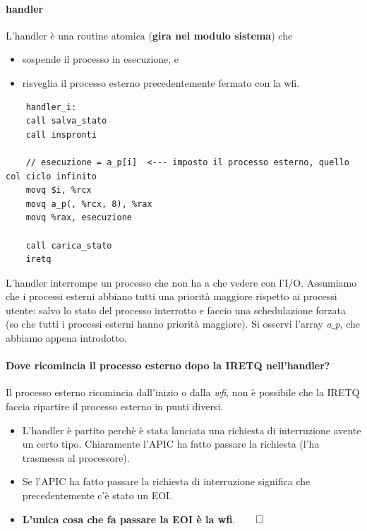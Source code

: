 \paragraph{handler} L'handler è una routine atomica (\textbf{gira nel modulo sistema}) che 
\begin{itemize}
	\item sospende il processo in esecuzione, e
	\item risveglia il processo esterno precedentemente fermato con la wfi.
\end{itemize} 
\begin{verbatim}
	handler_i:
	call salva_stato
	call inspronti
	
	// esecuzione = a_p[i]  <--- imposto il processo esterno, quello col ciclo infinito
	movq $i, %rcx 
	movq a_p(, %rcx, 8), %rax
	movq %rax, esecuzione
	
	call carica_stato
	iretq
\end{verbatim} L'handler interrompe un processo che non ha a che vedere con l'I/O. Assumiamo che i processi esterni abbiano tutti una priorità maggiore rispetto ai processi utente: salvo lo stato del processo interrotto e faccio una schedulazione forzata (so che tutti i processi esterni hanno priorità maggiore). Si osservi l'array \emph{a$\_$p}, che abbiamo appena introdotto.

\paragraph{Dove ricomincia il processo esterno dopo la IRETQ nell'handler?} 
Il processo esterno ricomincia dall'inizio o dalla \textit{wfi}, non è possibile che la IRETQ faccia ripartire il processo esterno in punti diversi.
\begin{itemize}
	\item L'handler è partito perchè è stata lanciata una richiesta di interruzione avente un certo tipo. Chiaramente l'APIC ha fatto passare la richiesta (l'ha trasmessa al processore).
	\item Se l'APIC ha fatto passare la richiesta di interruzione significa che precedentemente c'è stato un EOI. 
	\item \textbf{L'unica cosa che fa passare la EOI è la wfi}.$\qed$
\end{itemize}

